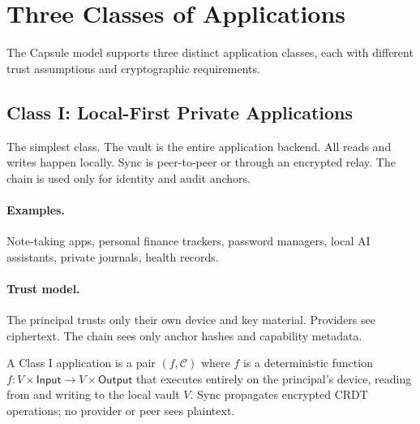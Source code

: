 

\section{Three Classes of Applications}
\label{sec:apps}

The Capsule model supports three distinct application classes, each with
different trust assumptions and cryptographic requirements.

\subsection{Class I: Local-First Private Applications}\label{sec:class1}

The simplest class. The vault is the entire application backend. All reads and
writes happen locally. Sync is peer-to-peer or through an encrypted relay.
The chain is used only for identity and audit anchors.

\paragraph{Examples.} Note-taking apps, personal finance trackers, password
managers, local AI assistants, private journals, health records.

\paragraph{Trust model.} The principal trusts only their own device and key
material. Providers see ciphertext. The chain sees only anchor hashes and
capability metadata.

\begin{definition}\label{def:class1}
A Class I application is a pair $(f, \mathcal{C})$ where $f$ is a deterministic
function $f: V \times \mathsf{Input} \to V \times \mathsf{Output}$ that executes
entirely on the principal's device, reading from and writing to the local vault $V$.
Sync propagates encrypted CRDT operations; no provider or peer sees plaintext.
\end{definition}

